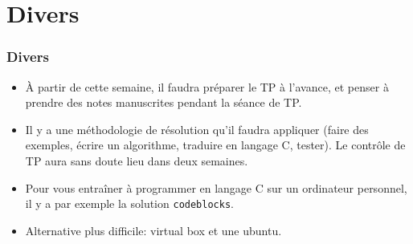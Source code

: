 \documentclass[xcolor=svgnames]{beamer}
\begin{document}
\section{Divers}
\begin{frame}
  \frametitle{Divers\nowrite}
  \begin{itemize}
  \item À partir de cette semaine, il faudra préparer le TP à
    l'avance, et penser à prendre des notes manuscrites pendant la
    séance de TP.\pause

   \item Il y a une méthodologie de résolution qu'il faudra appliquer
     (faire des exemples, écrire un algorithme, traduire en langage C,
     tester).  Le contrôle de TP aura sans doute lieu dans deux semaines.\pause

    \item Pour vous entraîner à programmer en langage C sur un
      ordinateur personnel, il y a par exemple la solution
      \texttt{codeblocks}. \pause

\item Alternative plus difficile: virtual box et une ubuntu.
  \end{itemize}
\end{frame}
\end{document}

